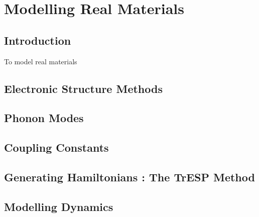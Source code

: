 
\chapter{Modelling Real Materials} %

\label{Chapter5} %


\section{Introduction}

To model real materials

\section{Electronic Structure Methods}

\section{Phonon Modes}

\section{Coupling Constants}

\section{Generating Hamiltonians : The TrESP Method}

\section{Modelling Dynamics}

